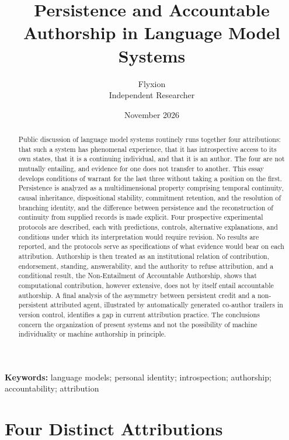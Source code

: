\documentclass[12pt]{article}
\title{Persistence and Accountable Authorship in Language Model Systems}
\author{Flyxion\\Independent Researcher}
\date{November 2026}
\theoremstyle{definition}
\theoremstyle{plain}
\begin{document}
\maketitle
\thispagestyle{empty}

\begin{abstract}
\noindent Public discussion of language model systems routinely runs together four attributions: that such a system has phenomenal experience, that it has introspective access to its own states, that it is a continuing individual, and that it is an author. The four are not mutually entailing, and evidence for one does not transfer to another. This essay develops conditions of warrant for the last three without taking a position on the first. Persistence is analyzed as a multidimensional property comprising temporal continuity, causal inheritance, dispositional stability, commitment retention, and the resolution of branching identity, and the difference between persistence and the reconstruction of continuity from supplied records is made explicit. Four prospective experimental protocols are described, each with predictions, controls, alternative explanations, and conditions under which its interpretation would require revision. No results are reported, and the protocols serve as specifications of what evidence would bear on each attribution. Authorship is then treated as an institutional relation of contribution, endorsement, standing, answerability, and the authority to refuse attribution, and a conditional result, the Non-Entailment of Accountable Authorship, shows that computational contribution, however extensive, does not by itself entail accountable authorship. A final analysis of the asymmetry between persistent credit and a non-persistent attributed agent, illustrated by automatically generated co-author trailers in version control, identifies a gap in current attribution practice. The conclusions concern the organization of present systems and not the possibility of machine individuality or machine authorship in principle.
\end{abstract}

\vspace{2.5em}
\noindent\textbf{Keywords:} language models; personal identity; introspection; authorship; accountability; attribution

\newpage

\section{Four Distinct Attributions}
\end{document}
